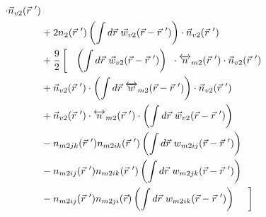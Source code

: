 \documentclass[double,12pt]{revtex4-2}
\begin{document}
\begin{align}
     \cdot \vec n_{v2}(\vec r~') \nonumber\\
      &+ 2n_2(\vec r~')\left(\int d\vec r ~\vec 
     w_{v2}(\vec r-\vec r~')\right)\cdot \vec n_{v2}(\vec r~')\nonumber \\
     &+\frac{9}{2}\left[\color{white}\frac{1}{1}\color{black}\left(\int 
     d\vec r ~\vec w_{v2}(\vec r-\vec r~')\right)\color{white}\right]
     \color{black}
     \cdot \overleftrightarrow n_{m2}(\vec r~')\cdot \vec n_{v2}(\vec r~') 
     \nonumber\\
     &+\vec n_{v2}(\vec r~')\cdot \left(\int d\vec r ~\overleftrightarrow 
     w_{m2}(\vec r-\vec r~')\right)
     \cdot \vec n_{v2}( \vec r~') \nonumber\\
%     
     &+ \color{white}\color{black}\vec n_{v2}( \vec r~')\cdot 
     \overleftrightarrow n_{m2}(\vec r~')
     \cdot \left(\int d\vec r ~\vec w_{v2}(\vec r-\vec r~')\right)
     \nonumber\\
     &-n_{m2jk}(\vec r~')n_{m2ik}(\vec r~')\left(\int d\vec r~w_{m2ij}
     (\vec r-\vec r~')\right) \nonumber \\
     &-n_{m2ij}(\vec r~')n_{m2ik}(\vec r~')\left(\int d\vec r~w_{m2jk}
     (\vec r-\vec r~')\right)\nonumber \\
     &-n_{m2ij}(\vec r~')n_{m2ji}(\vec r)\left(\int d\vec r~w_{m2ik}
     (\vec r-\vec r~')\right)     
     \color{white}\left[\frac{1}{1}\color{black}\right] 
\end{align} 
\end{document}
